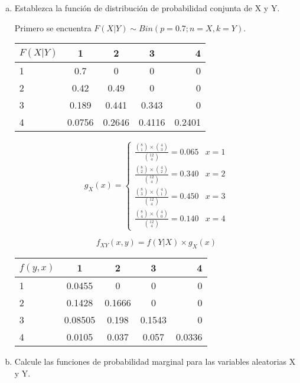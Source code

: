 \documentclass[../main.tex]{subfiles}
\begin{document}
\begin{enumerate}[(a)]

\item Establezca la función de distribución de probabilidad conjunta de X y Y.

Primero se encuentra $F(X|Y) \sim Bin(p = 0.7; n = X, k = Y)$.

\begin{center}

\begin{tabular}{l*{3}{c}r}
$F(X|Y)$         & 1 & 2 & 3 & 4 \\
\hline
1              & 0.7 & 0 & 0 & 0  \\
2              & 0.42 & 0.49 & 0 & 0  \\
3              & 0.189 & 0.441 & 0.343 & 0  \\
4              & 0.0756 & 0.2646 & 0.4116 & 0.2401
\end{tabular}

\end{center}

\[ g_{X}(x) = \begin{cases} 
      \frac{\binom{8}{1} \times \binom{4}{3}}{\binom{12}{4}} = 0.065 & x = 1\\
      \frac{\binom{8}{2} \times \binom{4}{2}}{\binom{12}{4}} = 0.340 & x = 2\\
      \frac{\binom{8}{3} \times \binom{4}{1}}{\binom{12}{4}} = 0.450 & x = 3\\
      \frac{\binom{8}{4} \times \binom{4}{0}}{\binom{12}{4}} = 0.140 & x = 4
   \end{cases}
\]

$$f_{XY}(x, y) = f(Y | X) \times g_{X}(x)$$

\begin{center}

\begin{tabular}{l*{3}{c}r}
$f(y, x)$         & 1 & 2 & 3 & 4 \\
\hline
1              & 0.0455 & 0 & 0 & 0  \\
2              & 0.1428 & 0.1666 & 0 & 0  \\
3              & 0.08505 & 0.198 & 0.1543 & 0  \\
4              & 0.0105 & 0.037 & 0.057 & 0.0336
\end{tabular}

\end{center}

\item Calcule las funciones de probabilidad marginal para las variables
aleatorias X y Y.


\end{enumerate}
\end{document}
